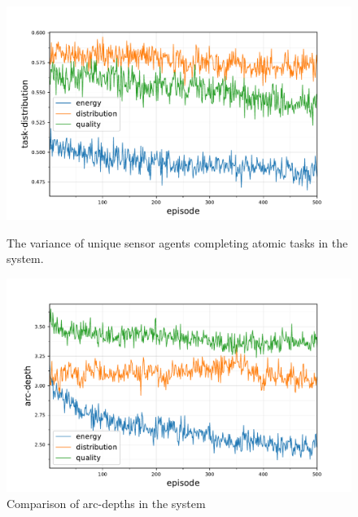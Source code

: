 \begin{figure}[ht]
	\begin{minipage}{.49\textwidth}
		\centering
		\includegraphics[width=1.0\linewidth,trim={25pt 0pt 50pt 0pt},clip]{5.19_ctv-task-distribution-comparison}
		\caption{The variance of unique sensor agents completing \newline atomic  tasks in the \simulationExtended{}{} system.}
		\label{fig:ctv-task-distribution-comparison}
	\end{minipage}\hfill%
	\begin{minipage}{.49\textwidth}
		\centering
		\includegraphics[width=1.0\linewidth,trim={25pt 0pt 50pt 0pt},clip]{5.19_ctv-arc-depth-comparison}
		\caption{Comparison of arc-depths in the \simulationExtended{}{} \newline system}
		\label{fig:ctv-arc-depth-comparison}
	\end{minipage}
\end{figure}

